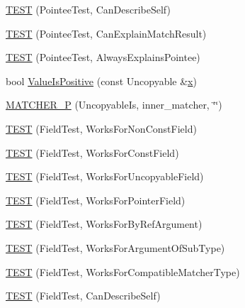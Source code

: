 \begin{DoxyCompactItemize}
\mbox{\hyperlink{namespacetesting_1_1gmock__matchers__test_ac8b9baa938635d587f0b0df1073208e2}{T\+E\+ST}} (Pointee\+Test, Can\+Describe\+Self)
\item 
\mbox{\hyperlink{namespacetesting_1_1gmock__matchers__test_a263ede06f6b32a625bb40e4f4c58c8dc}{T\+E\+ST}} (Pointee\+Test, Can\+Explain\+Match\+Result)
\item 
\mbox{\hyperlink{namespacetesting_1_1gmock__matchers__test_a00128de027ff6f49f82a7011dd346d43}{T\+E\+ST}} (Pointee\+Test, Always\+Explains\+Pointee)
\item 
bool \mbox{\hyperlink{namespacetesting_1_1gmock__matchers__test_a7c429b4fa8a7835724d9e28033e908b2}{Value\+Is\+Positive}} (const Uncopyable \&\mbox{\hyperlink{_obj__test_2lib_2googletest-master_2googlemock_2test_2gmock-matchers__test_8cc_a6150e0515f7202e2fb518f7206ed97dc}{x}})
\item 
\mbox{\hyperlink{namespacetesting_1_1gmock__matchers__test_a55a8eba9beb33753baf7690d4cb9cd7e}{M\+A\+T\+C\+H\+E\+R\+\_\+P}} (Uncopyable\+Is, inner\+\_\+matcher, \char`\"{}\char`\"{})
\item 
\mbox{\hyperlink{namespacetesting_1_1gmock__matchers__test_a57213a63527bbd66c024dd1cfafe92d1}{T\+E\+ST}} (Field\+Test, Works\+For\+Non\+Const\+Field)
\item 
\mbox{\hyperlink{namespacetesting_1_1gmock__matchers__test_a065efc397a420d3dde87909b4a9a6285}{T\+E\+ST}} (Field\+Test, Works\+For\+Const\+Field)
\item 
\mbox{\hyperlink{namespacetesting_1_1gmock__matchers__test_ac26d681f09865b0727ca32343d974907}{T\+E\+ST}} (Field\+Test, Works\+For\+Uncopyable\+Field)
\item 
\mbox{\hyperlink{namespacetesting_1_1gmock__matchers__test_a56b1c75b98aaa5c9d3a6dec2d3ba30dc}{T\+E\+ST}} (Field\+Test, Works\+For\+Pointer\+Field)
\item 
\mbox{\hyperlink{namespacetesting_1_1gmock__matchers__test_afcb890c159493e250477408a453b08d1}{T\+E\+ST}} (Field\+Test, Works\+For\+By\+Ref\+Argument)
\item 
\mbox{\hyperlink{namespacetesting_1_1gmock__matchers__test_ae720452c3587433e26bea2ea7e91f8e6}{T\+E\+ST}} (Field\+Test, Works\+For\+Argument\+Of\+Sub\+Type)
\item 
\mbox{\hyperlink{namespacetesting_1_1gmock__matchers__test_a27058ed7297742f08419bc5feb3ef687}{T\+E\+ST}} (Field\+Test, Works\+For\+Compatible\+Matcher\+Type)
\item 
\mbox{\hyperlink{namespacetesting_1_1gmock__matchers__test_ac43583cb3c4221aa6bd0132c2cb3fed6}{T\+E\+ST}} (Field\+Test, Can\+Describe\+Self)

\end{DoxyCompactItemize}
